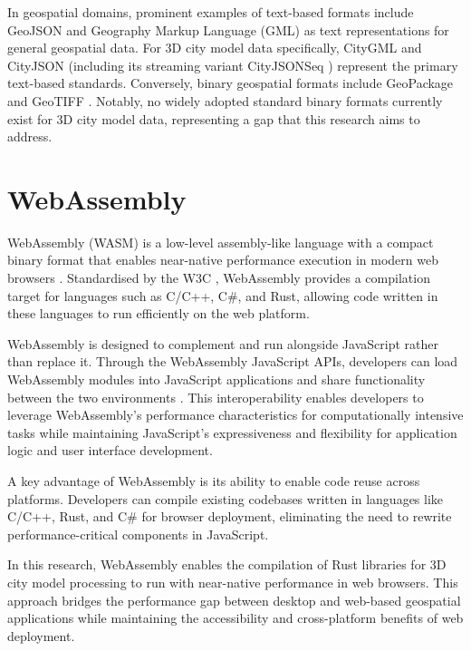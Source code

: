 In geospatial domains, prominent examples of text-based formats include GeoJSON \citep{geojson} and Geography Markup Language (GML) \citep{gml} as text representations for general geospatial data. For 3D city model data specifically, CityGML \citep{CityGML} and CityJSON \citep{cityjson} (including its streaming variant CityJSONSeq \citep{ledoux_2024}) represent the primary text-based standards. Conversely, binary geospatial formats include GeoPackage \citep{geopackage} and GeoTIFF \citep{geotiff}. Notably, no widely adopted standard binary formats currently exist for 3D city model data, representing a gap that this research aims to address.

\section{WebAssembly}
\label{tb:webassembly}
WebAssembly (WASM) is a low-level assembly-like language with a compact binary format that enables near-native performance execution in modern web browsers \citep{WebAssembly}. Standardised by the W3C \citep{WebAssemblyCoreSpecification1, WebAssemblyCoreSpecification2}, WebAssembly provides a compilation target for languages such as C/C++, C\#, and Rust, allowing code written in these languages to run efficiently on the web platform.

WebAssembly is designed to complement and run alongside JavaScript rather than replace it. Through the WebAssembly JavaScript APIs, developers can load WebAssembly modules into JavaScript applications and share functionality between the two environments \citep{WebAssembly}. This interoperability enables developers to leverage WebAssembly's performance characteristics for computationally intensive tasks while maintaining JavaScript's expressiveness and flexibility for application logic and user interface development.

A key advantage of WebAssembly is its ability to enable code reuse across platforms. Developers can compile existing codebases written in languages like C/C++, Rust, and C\# for browser deployment, eliminating the need to rewrite performance-critical components in JavaScript.

In this research, WebAssembly enables the compilation of Rust libraries for 3D city model processing to run with near-native performance in web browsers. This approach bridges the performance gap between desktop and web-based geospatial applications while maintaining the accessibility and cross-platform benefits of web deployment.

